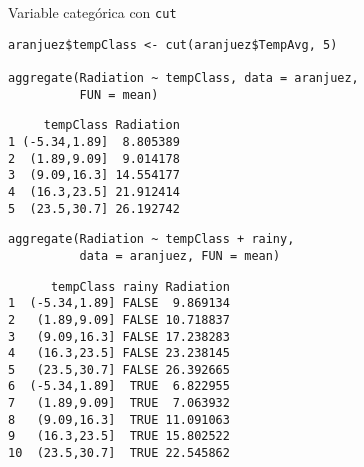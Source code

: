 \documentclass[xcolor={usenames,svgnames,dvipsnames}]{beamer}
\begin{document}
\begin{frame}[label={sec:org374a71a},fragile]{Variable categórica con \texttt{cut}}
 \lstset{language=r,label= ,caption= ,captionpos=b,numbers=none}
\begin{lstlisting}
aranjuez$tempClass <- cut(aranjuez$TempAvg, 5)

aggregate(Radiation ~ tempClass, data = aranjuez,
          FUN = mean)
\end{lstlisting}

\begin{verbatim}
     tempClass Radiation
1 (-5.34,1.89]  8.805389
2  (1.89,9.09]  9.014178
3  (9.09,16.3] 14.554177
4  (16.3,23.5] 21.912414
5  (23.5,30.7] 26.192742
\end{verbatim}


\lstset{language=r,label= ,caption= ,captionpos=b,numbers=none}
\begin{lstlisting}
aggregate(Radiation ~ tempClass + rainy,
          data = aranjuez, FUN = mean)
\end{lstlisting}

\begin{verbatim}
      tempClass rainy Radiation
1  (-5.34,1.89] FALSE  9.869134
2   (1.89,9.09] FALSE 10.718837
3   (9.09,16.3] FALSE 17.238283
4   (16.3,23.5] FALSE 23.238145
5   (23.5,30.7] FALSE 26.392665
6  (-5.34,1.89]  TRUE  6.822955
7   (1.89,9.09]  TRUE  7.063932
8   (9.09,16.3]  TRUE 11.091063
9   (16.3,23.5]  TRUE 15.802522
10  (23.5,30.7]  TRUE 22.545862
\end{verbatim}
\end{frame}
\end{document}
